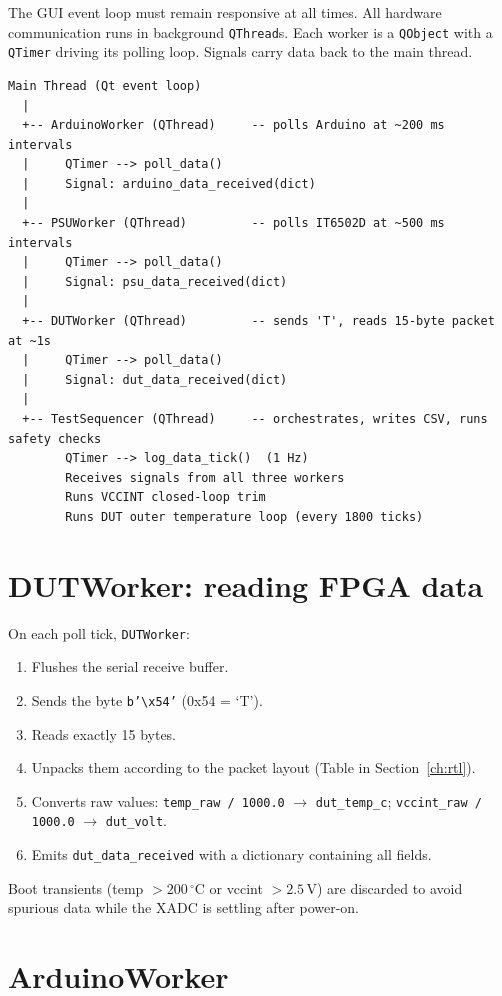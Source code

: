 \documentclass[12pt, a4paper]{report}
\begin{document}
The GUI event loop must remain responsive at all times. All hardware communication
runs in background \texttt{QThread}s. Each worker is a \texttt{QObject} with a
\texttt{QTimer} driving its polling loop. Signals carry data back to the main thread.

\begin{lstlisting}[style=shell, caption={Thread structure}]
Main Thread (Qt event loop)
  |
  +-- ArduinoWorker (QThread)     -- polls Arduino at ~200 ms intervals
  |     QTimer --> poll_data()
  |     Signal: arduino_data_received(dict)
  |
  +-- PSUWorker (QThread)         -- polls IT6502D at ~500 ms intervals
  |     QTimer --> poll_data()
  |     Signal: psu_data_received(dict)
  |
  +-- DUTWorker (QThread)         -- sends 'T', reads 15-byte packet at ~1s
  |     QTimer --> poll_data()
  |     Signal: dut_data_received(dict)
  |
  +-- TestSequencer (QThread)     -- orchestrates, writes CSV, runs safety checks
        QTimer --> log_data_tick()  (1 Hz)
        Receives signals from all three workers
        Runs VCCINT closed-loop trim
        Runs DUT outer temperature loop (every 1800 ticks)
\end{lstlisting}

\section{DUTWorker: reading FPGA data}

On each poll tick, \texttt{DUTWorker}:
\begin{enumerate}
  \item Flushes the serial receive buffer.
  \item Sends the byte \texttt{b'\textbackslash x54'} (0x54 = `T').
  \item Reads exactly 15 bytes.
  \item Unpacks them according to the packet layout (Table in Section~\ref{ch:rtl}).
  \item Converts raw values: \texttt{temp\_raw / 1000.0} $\rightarrow$ \texttt{dut\_temp\_c};
        \texttt{vccint\_raw / 1000.0} $\rightarrow$ \texttt{dut\_volt}.
  \item Emits \texttt{dut\_data\_received} with a dictionary containing all fields.
\end{enumerate}

Boot transients (temp $> 200\,^\circ$C or vccint $> 2.5\,\text{V}$) are
discarded to avoid spurious data while the XADC is settling after power-on.

\section{ArduinoWorker}
\end{document}
